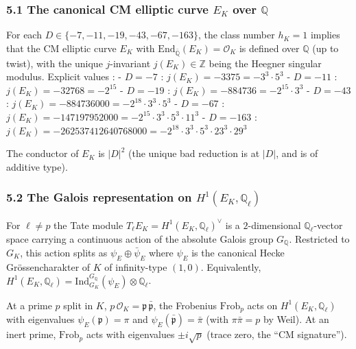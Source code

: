 \documentclass[
  11pt,
  a4paper,
]{amsart}
\begin{document}
\hypertarget{the-canonical-cm-elliptic-curve-e_k-over-mathbbq}{%
\subsubsection{\texorpdfstring{5.1 The canonical CM elliptic curve \(E_K\) over \(\mathbb{Q}\)}{5.1 The canonical CM elliptic curve E\_K over \textbackslash mathbb\{Q\}}}\label{the-canonical-cm-elliptic-curve-e_k-over-mathbbq}}

For each \(D \in \{-7, -11, -19, -43, -67, -163\}\), the class number \(h_K = 1\) implies that the CM elliptic curve \(E_K\) with \(\mathrm{End}_{\bar{\mathbb{Q}}}(E_K) = \mathcal{O}_K\) is defined over \(\mathbb{Q}\) (up to twist), with the unique \(j\)-invariant \(j(E_K) \in \mathbb{Z}\) being the Heegner singular modulus. Explicit values :
- \(D = -7\) : \(j(E_K) = -3375 = -3^3 \cdot 5^3\)
- \(D = -11\) : \(j(E_K) = -32768 = -2^{15}\)
- \(D = -19\) : \(j(E_K) = -884736 = -2^{15} \cdot 3^3\)
- \(D = -43\) : \(j(E_K) = -884736000 = -2^{18} \cdot 3^3 \cdot 5^3\)
- \(D = -67\) : \(j(E_K) = -147197952000 = -2^{15} \cdot 3^3 \cdot 5^3 \cdot 11^3\)
- \(D = -163\) : \(j(E_K) = -262537412640768000 = -2^{18} \cdot 3^3 \cdot 5^3 \cdot 23^3 \cdot 29^3\)

The conductor of \(E_K\) is \(|D|^2\) (the unique bad reduction is at \(|D|\), and is of additive type).

\hypertarget{the-galois-representation-on-h1e_k-mathbbq_ell}{%
\subsubsection{\texorpdfstring{5.2 The Galois representation on \(H^1(E_K, \mathbb{Q}_\ell)\)}{5.2 The Galois representation on H\^{}1(E\_K, \textbackslash mathbb\{Q\}\_\textbackslash ell)}}\label{the-galois-representation-on-h1e_k-mathbbq_ell}}

For \(\ell \neq p\) the Tate module \(T_\ell E_K = H^1(E_K, \mathbb{Q}_\ell)^\vee\) is a \(2\)-dimensional \(\mathbb{Q}_\ell\)-vector space carrying a continuous action of the absolute Galois group \(G_\mathbb{Q}\). Restricted to \(G_K\), this action splits as \(\psi_E \oplus \bar\psi_E\) where \(\psi_E\) is the canonical Hecke Grössencharakter of \(K\) of infinity-type \((1, 0)\). Equivalently, \(H^1(E_K, \mathbb{Q}_\ell) = \mathrm{Ind}_{G_K}^{G_\mathbb{Q}}(\psi_E) \otimes \mathbb{Q}_\ell\).

At a prime \(p\) split in \(K\), \(p\,\mathcal{O}_K = \mathfrak{p}\,\bar{\mathfrak{p}}\), the Frobenius \(\mathrm{Frob}_p\) acts on \(H^1(E_K, \mathbb{Q}_\ell)\) with eigenvalues \(\psi_E(\mathfrak{p}) = \pi\) and \(\psi_E(\bar{\mathfrak{p}}) = \bar\pi\) (with \(\pi\bar\pi = p\) by Weil). At an inert prime, \(\mathrm{Frob}_p\) acts with eigenvalues \(\pm i\sqrt p\) (trace zero, the ``CM signature'').
\end{document}
